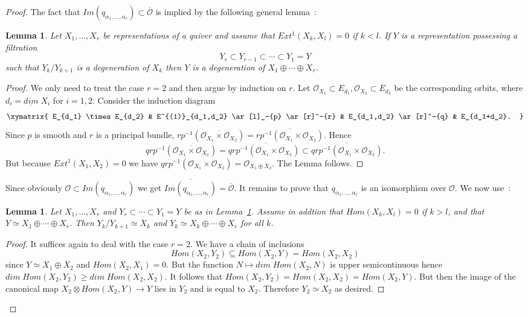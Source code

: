 \documentclass[a4paper,10pt]{amsart}
\def\a{\alpha}
\newtheorem{lem}[theo]{Lemma}
\numberwithin{equation}{section}
\begin{document}
\begin{proof}
The fact that $Im(q_{\a_1, \ldots, \a_r}) \subset \overline{\mathcal{O}}$ is implied by the following general lemma~:
\begin{lem}\label{L:213} Let $X_1, \ldots, X_r$ be representations of a quiver and assume that $Ext^1(X_k,X_l)=0$ if $k<l$. If $Y$ is a representation possessing a filtration
$$Y_r \subset Y_{r-1} \subset \cdots \subset Y_1=Y$$
such that $Y_k/Y_{k+1}$ is a degeneration of $X_k$ then $Y$ is a degeneration of $X_1 \oplus \cdots \oplus X_r$.
\end{lem}
\begin{proof} We only need to treat the case $r=2$ and then argue by induction on $r$. Let $\mathcal{O}_{X_1} \subset E_{d_1}, \mathcal{O}_{X_2} \subset E_{d_2}$ be the corresponding orbits, where $d_i=\underline{dim}\;X_i$ for $i=1,2$. Consider the induction diagram
$$\xymatrix{ E_{d_1} \times E_{d_2} & E^{(1)}_{d_1,d_2} \ar[l]_-{p} \ar[r]^-{r} & E_{d_1,d_2} \ar[r]^-{q} & E_{d_1+d_2}.
}$$
Since $p$ is smooth and $r$ is a principal bundle, $r p^{-1} (\overline{\mathcal{O}_{X_1} \times \mathcal{O}_{X_2}}) = \overline{rp^{-1}(\mathcal{O}_{X_1} \times \mathcal{O}_{X_2})}$. Hence
$$qr p^{-1} (\overline{\mathcal{O}_{X_1} \times \mathcal{O}_{X_2}}) = q\overline{rp^{-1}(\mathcal{O}_{X_1} \times \mathcal{O}_{X_2})}
\subset \overline{qrp^{-1}(\mathcal{O}_{X_1} \times \mathcal{O}_{X_2})}.$$
But because $Ext^1(X_1,X_2)=0$ we have $qrp^{-1}(\mathcal{O}_{X_1} \times \mathcal{O}_{X_2}) = \mathcal{O}_{X_1 \oplus X_2}$. The Lemma follows.\end{proof}

\vspace{.1in}

Since obviously $\mathcal{O} \subset Im(q_{\a_1, \ldots, \a_r})$ we get $\overline{Im(q_{\a_1, \ldots, \a_r})}=\overline{\mathcal{O}}$. 
It remains to prove that $q_{\a_1, \ldots , \a_r}$ is an isomorphism over $\mathcal{O}$. We now use~:

\begin{lem}\label{L:22} Let $X_1, \ldots, X_r$ and $Y_r \subset \cdots \subset Y_1=Y$ be as in Lemma~\ref{L:213}. Assume in addtion that $Hom(X_k,X_l)=0$ if $k>l$, and that $Y \simeq X_1 \oplus \cdots \oplus X_r$. Then $Y_k/Y_{k+1} \simeq X_k$  and $Y_k \simeq X_k \oplus \cdots \oplus X_r$ for all $k$.
\end{lem}
\begin{proof} It suffices again to deal with the case $r=2$. We have a chain of inclusions
$$Hom(X_2,Y_2) \subseteq Hom(X_2,Y) =Hom(X_2,X_2)$$
since $Y \simeq X_1 \oplus X_2$ and $Hom(X_2, X_1)=0$. But the function $N \mapsto dim\;Hom(X_2,N)$ is upper semicontinuous hence $dim\;Hom(X_2,Y_2) \geq dim\;Hom(X_2,X_2)$. It follows that $Hom(X_2,Y_2)=Hom(X_2,X_2)=Hom(X_2,Y)$. But then the image of the canonical map $X_2 \otimes Hom(X_2,Y) \to Y$ lies in $Y_2$ and is equal to $X_2$. Therefore $Y_2 \simeq X_2$ as desired.
\end{proof}


\end{proof}
\end{document}
